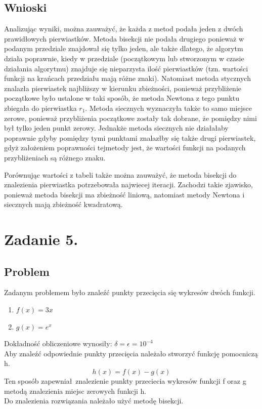 \documentclass[11pt, a4paper]{article}
\begin{document}
    \subsection{Wnioski}
    Analizując wyniki, można zauważyć, że każda z metod podała jeden z dwóch prawidłowych pierwiastków. Metoda bisekcji nie podała drugiego ponieważ w podanym przedziale znajdował się tylko jeden, ale także dlatego, że algorytm działa poprawnie, kiedy w przedziale (początkowym lub stworzonym w czasie działania algorytmu) znajduje się nieparzysta ilość pierwiastków (tzn. wartości funkcji na krańcach przedziału mają różne znaki). Natomiast metoda stycznych znalazła pierwiastek najbliższy w kierunku zbieżności, ponieważ przybliżenie początkowe było ustalone w taki sposób, że metoda Newtona z tego punktu zbiegała do pierwiastka $r_{1}$. Metoda siecznych wyznaczyła także to samo miejsce zerowe, ponieważ przybliżenia początkowe zostały tak dobrane, że pomiędzy nimi był tylko jeden punkt zerowy. Jednakże metoda siecznych nie działałaby poprawnie gdyby pomiędzy tymi punktami znalazłby się także drugi pierwiastek, gdyż założeniem poprawności tejmetody jest, że wartości funkcji na podanych przybliżeniach są różnego znaku.

    Porównując wartości z tabeli także można zauważyć, że metoda bisekcji do znalezienia pierwiastka potrzebowała najwiecej iteracji. Zachodzi takie zjawisko, ponieważ metoda bisekcji ma zbieżność liniową, natomiast metody Newtona i siecznych mają zbieżność kwadratową.

    \section{Zadanie 5.}
    \subsection{Problem}
    Zadanym problemem było znaleźć punkty przecięcia się wykresów dwóch funkcji.
    \begin{enumerate}
        \item $f(x) = 3x$
        \item $g(x) = e^{x}$
    \end{enumerate}
    Dokładność obliczeniowe wynosiły: $\delta = \epsilon = 10^{-4}$\\
    Aby znaleźć odpowiednie punkty przecięcia należało stworzyć funkcję pomocniczą h.
    \[h(x) = f(x) - g(x)\]
    Ten sposób zapewniał znalezienie punkty przeciecia wykresów funkcji f oraz g metodą znalezienia miejsc zerowych funkcji h.\\
    Do znalezienia rozwiązania należało użyć metodę bisekcji.
\end{document}
